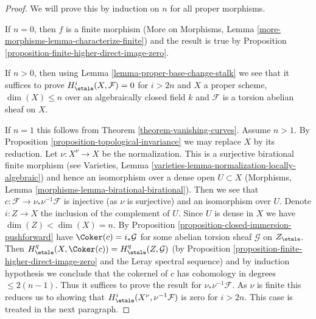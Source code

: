 \begin{proof}
We will prove this by induction on $n$ for all proper morphisms.

\medskip\noindent
If $n = 0$, then $f$ is a finite morphism
(More on Morphisms, Lemma \ref{more-morphisms-lemma-characterize-finite})
and the
result is true by Proposition \ref{proposition-finite-higher-direct-image-zero}.

\medskip\noindent
If $n > 0$, then using Lemma \ref{lemma-proper-base-change-stalk}
we see that it suffices to prove $H^i_\etale(X, \mathcal{F}) = 0$
for $i > 2n$ and $X$ a proper scheme, $\dim(X) \leq n$
over an algebraically closed field $k$
and $\mathcal{F}$ is a torsion abelian sheaf on $X$.

\medskip\noindent
If $n = 1$ this follows from Theorem \ref{theorem-vanishing-curves}.
Assume $n > 1$. By Proposition \ref{proposition-topological-invariance}
we may replace $X$ by its reduction.
Let $\nu : X^\nu \to X$ be the normalization.
This is a surjective birational finite morphism
(see Varieties, Lemma \ref{varieties-lemma-normalization-locally-algebraic})
and hence an isomorphism over a dense open $U \subset X$
(Morphisms, Lemma \ref{morphisms-lemma-birational-birational}).
Then we see that
$c : \mathcal{F} \to \nu_*\nu^{-1}\mathcal{F}$ is injective
(as $\nu$ is surjective) and an isomorphism over $U$.
Denote $i : Z \to X$ the inclusion of the complement of $U$.
Since $U$ is dense in $X$ we have $\dim(Z) < \dim(X) = n$.
By Proposition \ref{proposition-closed-immersion-pushforward} have
$\Coker(c) = i_*\mathcal{G}$ for some
abelian torsion sheaf $\mathcal{G}$ on $Z_\etale$.
Then $H^q_\etale(X, \Coker(c)) = H^q_\etale(Z, \mathcal{G})$
(by Proposition \ref{proposition-finite-higher-direct-image-zero}
and the Leray spectral sequence) and by induction hypothesis we conclude that
the cokernel of $c$ has cohomology in degrees $\leq 2(n - 1)$.
Thus it suffices to prove the result for $\nu_*\nu^{-1}\mathcal{F}$.
As $\nu$ is finite this reduces us to showing
that $H^i_\etale(X^\nu, \nu^{-1}\mathcal{F})$ is
zero for $i > 2n$. This case is treated in the next paragraph.


\end{proof}
